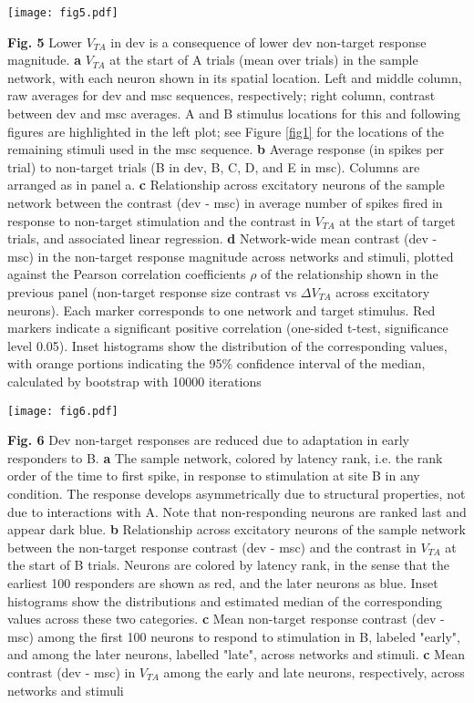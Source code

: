 \documentclass[pdflatex,referee,iicol,sn-basic]{sn-jnl}
\theoremstyle{thmstyleone}%
\theoremstyle{thmstyletwo}%
\theoremstyle{thmstylethree}%
\begin{document}
\begin{figure*}%
    \centering
    \texttt{[image: fig5.pdf]}
    \caption{}
    \label{fig5}
\end{figure*}
\textbf{Fig. 5} Lower $V_{TA}$ in dev is a consequence of lower dev non-target response magnitude.
\textbf{a} $V_{TA}$ at the start of A trials (mean over trials) in the sample network, with each neuron shown in its spatial location. Left and middle column, raw averages for dev and msc sequences, respectively; right column, contrast between dev and msc averages. A and B stimulus locations for this and following figures are highlighted in the left plot; see Figure \ref{fig1} for the locations of the remaining stimuli used in the msc sequence.
\textbf{b} Average response (in spikes per trial) to non-target trials (B in dev, B, C, D, and E in msc). Columns are arranged as in panel a.
\textbf{c} Relationship across excitatory neurons of the sample network between the contrast (dev - msc) in average number of spikes fired in response to non-target stimulation and the contrast in $V_{TA}$ at the start of target trials, and associated linear regression.
\textbf{d} Network-wide mean contrast (dev - msc) in the non-target response magnitude across networks and stimuli, plotted against the Pearson correlation coefficients $\rho$ of the relationship shown in the previous panel (non-target response size contrast vs $\Delta V_{TA}$ across excitatory neurons). Each marker corresponds to one network and target stimulus. Red markers indicate a significant positive correlation (one-sided t-test, significance level 0.05). Inset histograms show the distribution of the corresponding values, with orange portions indicating the 95\% confidence interval of the median, calculated by bootstrap with 10000 iterations

\begin{figure*}%
    \centering
    \texttt{[image: fig6.pdf]}
    \caption{}
    \label{fig6}
\end{figure*}
\textbf{Fig. 6} Dev non-target responses are reduced due to adaptation in early responders to B.
\textbf{a} The sample network, colored by latency rank, i.e. the rank order of the time to first spike, in response to stimulation at site B in any condition. The response develops asymmetrically due to structural properties, not due to interactions with A. Note that non-responding neurons are ranked last and appear dark blue.
\textbf{b} Relationship across excitatory neurons of the sample network between the non-target response contrast (dev - msc) and the contrast in $V_{TA}$ at the start of B trials. Neurons are colored by latency rank, in the sense that the earliest 100 responders are shown as red, and the later neurons as blue. Inset histograms show the distributions and estimated median of the corresponding values across these two categories.
\textbf{c} Mean non-target response contrast (dev - msc) among the first 100 neurons to respond to stimulation in B, labeled "early", and among the later neurons, labelled "late", across networks and stimuli.
\textbf{c} Mean contrast (dev - msc) in $V_{TA}$ among the early and late neurons, respectively, across networks and stimuli
\end{document}
